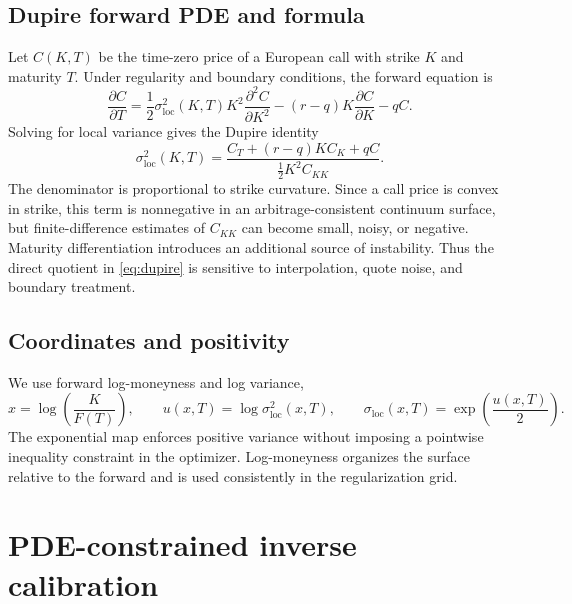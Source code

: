 \documentclass[11pt,a4paper]{article}
\begin{document}
\subsection{Dupire forward PDE and formula}
Let $C(K,T)$ be the time-zero price of a European call with strike $K$ and maturity $T$. Under regularity and boundary conditions, the forward equation is
\begin{equation}\label{eq:forward}
 \frac{\partial C}{\partial T}
 =\frac{1}{2}\sigma_{\mathrm{loc}}^2(K,T)K^2\frac{\partial^2 C}{\partial K^2}
 -(r-q)K\frac{\partial C}{\partial K}-qC.
\end{equation}
Solving for local variance gives the Dupire identity \cite{Dupire1994,DermanKani1994}
\begin{equation}\label{eq:dupire}
 \sigma_{\mathrm{loc}}^2(K,T)=
 \frac{C_T+(r-q)KC_K+qC}{\tfrac12K^2C_{KK}}.
\end{equation}
The denominator is proportional to strike curvature. Since a call price is convex in strike, this term is nonnegative in an arbitrage-consistent continuum surface, but finite-difference estimates of $C_{KK}$ can become small, noisy, or negative. Maturity differentiation introduces an additional source of instability. Thus the direct quotient in \eqref{eq:dupire} is sensitive to interpolation, quote noise, and boundary treatment.

\subsection{Coordinates and positivity}
We use forward log-moneyness and log variance,
\begin{equation}\label{eq:coords}
 x=\log\!\left(\frac{K}{F(T)}\right),\qquad
 u(x,T)=\log\sigma_{\mathrm{loc}}^2(x,T),\qquad
 \sigma_{\mathrm{loc}}(x,T)=\exp\!\left(\frac{u(x,T)}{2}\right).
\end{equation}
The exponential map enforces positive variance without imposing a pointwise inequality constraint in the optimizer. Log-moneyness organizes the surface relative to the forward and is used consistently in the regularization grid.

\section{PDE-constrained inverse calibration}\label{sec:inverse}
\end{document}
